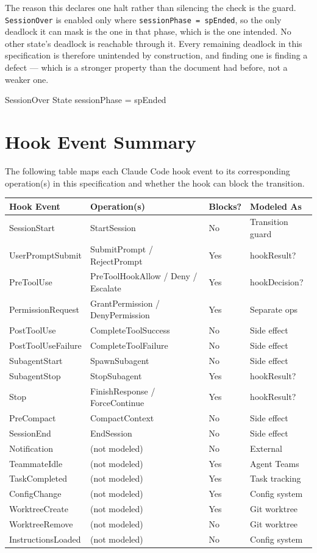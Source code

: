 \documentclass[a4paper,10pt,fleqn]{article}
\begin{document}
The reason this declares one halt rather than silencing the check is the
guard. \texttt{SessionOver} is enabled only where
\texttt{sessionPhase = spEnded}, so the only deadlock it can mask is the
one in that phase, which is the one intended. No other state's deadlock
is reachable through it. Every remaining deadlock in this specification
is therefore unintended by construction, and finding one is finding a
defect --- which is a stronger property than the document had before,
not a weaker one.

\begin{schema}{SessionOver}
  \Xi State
  \where
  sessionPhase = spEnded
\end{schema}

\section{Hook Event Summary}

The following table maps each Claude Code hook event to its
corresponding operation(s) in this specification and whether the hook
can block the transition.

\begin{tabular}{llll}
\hline
\textbf{Hook Event} & \textbf{Operation(s)} & \textbf{Blocks?} & \textbf{Modeled As} \\
\hline
SessionStart & StartSession & No & Transition guard \\
UserPromptSubmit & SubmitPrompt / RejectPrompt & Yes & hookResult? \\
PreToolUse & PreToolHookAllow / Deny / Escalate & Yes & hookDecision? \\
PermissionRequest & GrantPermission / DenyPermission & Yes & Separate ops \\
PostToolUse & CompleteToolSuccess & No & Side effect \\
PostToolUseFailure & CompleteToolFailure & No & Side effect \\
SubagentStart & SpawnSubagent & No & Side effect \\
SubagentStop & StopSubagent & Yes & hookResult? \\
Stop & FinishResponse / ForceContinue & Yes & hookResult? \\
PreCompact & CompactContext & No & Side effect \\
SessionEnd & EndSession & No & Side effect \\
Notification & (not modeled) & No & External \\
TeammateIdle & (not modeled) & Yes & Agent Teams \\
TaskCompleted & (not modeled) & Yes & Task tracking \\
ConfigChange & (not modeled) & Yes & Config system \\
WorktreeCreate & (not modeled) & Yes & Git worktree \\
WorktreeRemove & (not modeled) & No & Git worktree \\
InstructionsLoaded & (not modeled) & No & Config system \\
\hline
\end{tabular}
\end{document}
